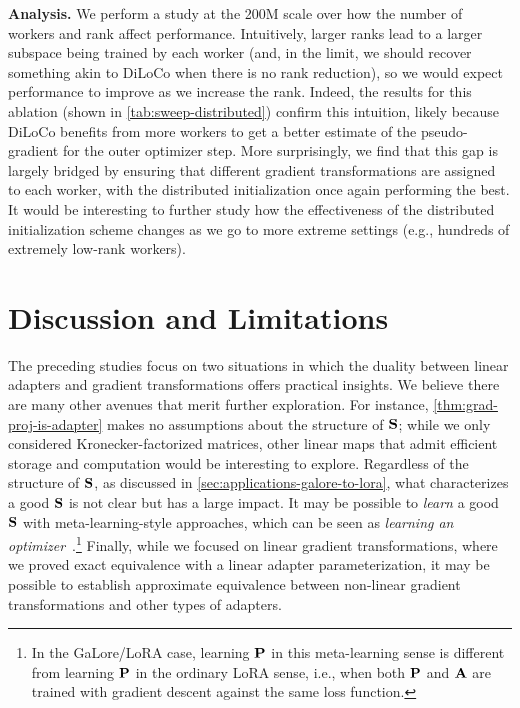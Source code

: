 \noindent\textbf{Analysis.} We perform a study at the 200M scale over how the number of workers and rank affect performance. Intuitively, larger ranks lead to a larger subspace being trained by each worker (and, in the limit, we should recover something akin to DiLoCo when there is no rank reduction), so we would expect performance to improve as we increase the rank.
Indeed, the results for this ablation (shown in \cref{tab:sweep-distributed}) confirm this intuition, likely because DiLoCo benefits from more workers to get a better estimate of the pseudo-gradient for the outer optimizer step.
More surprisingly, we find that this gap is largely bridged by ensuring that different gradient transformations are assigned to each worker, with the distributed initialization once again performing the best. It would be interesting to further study how the effectiveness of the distributed initialization scheme changes as we go to more extreme settings (e.g., hundreds of extremely low-rank workers).




\vcram{-2mm}
\section{Discussion and Limitations}
\vcram{-2mm}
The preceding studies focus on two situations in which the duality between linear adapters and gradient transformations offers practical insights.
We believe there are many other avenues that merit further exploration.
For instance, \cref{thm:grad-proj-is-adapter} makes no assumptions about the structure of ${\mathbf{S}}$; while we only considered Kronecker-factorized matrices, other linear maps that admit efficient storage and computation  would be interesting to explore.
Regardless of the structure of ${\mathbf{S}}$, as discussed in \cref{sec:applications-galore-to-lora}, what characterizes a good ${\mathbf{S}}$ is not clear but has a large impact. 
It may be possible to \emph{learn} a good ${\mathbf{S}}$ with meta-learning-style approaches, which can be seen as \emph{learning an optimizer}~\citep[][\emph{i.a.}]{andrychowicz2016learning,li2016learning,wichrowska2017learned,bello2017neural}.\footnote{In the GaLore/LoRA case, learning ${\mathbf{P}}$ in this meta-learning sense is different from learning ${\mathbf{P}}$ in the ordinary LoRA sense, i.e., when both ${\mathbf{P}}$ and ${\mathbf{A}}$ are trained with gradient descent against the same loss function.} 
Finally, while we focused on linear gradient transformations, where we proved exact equivalence with a linear adapter parameterization, it may be possible to establish approximate equivalence between non-linear gradient transformations and other types of adapters.

